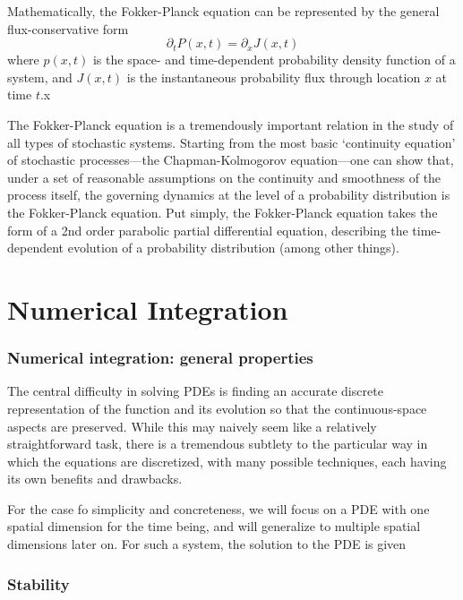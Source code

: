 \documentclass[15pt]{article}
\begin{document}
Mathematically, the Fokker-Planck equation can be represented by the general flux-conservative form
\begin{equation}
    \partial_t P(x, t) = \partial_x J(x, t)
\end{equation}
where $p(x, t)$ is the space- and time-dependent probability density function of a system, and $J(x, t)$ is the instantaneous probability flux through location $x$ at time $t$.x


The Fokker-Planck equation is a tremendously important relation in the study of all types of stochastic systems. Starting from the most basic `continuity equation' of stochastic processes---the Chapman-Kolmogorov equation---one can show that, under a set of reasonable assumptions on the continuity and smoothness of the process itself, the governing dynamics at the level of a probability distribution is the Fokker-Planck equation.  Put simply, the Fokker-Planck equation takes the form of a 2nd order parabolic partial differential equation, describing the time-dependent evolution of a probability distribution (among other things).

\part{Numerical Integration}


\section{Numerical integration: general properties}
The central difficulty in solving PDEs is finding an accurate discrete representation of the function and its evolution so that the continuous-space aspects are preserved.  While this may naively seem like a relatively straightforward task, there is a tremendous subtlety to the particular way in which the equations are discretized, with many possible techniques, each having its own benefits and drawbacks.

For the case fo simplicity and concreteness, we will focus on a PDE with one spatial dimension for the time being, and will generalize to multiple spatial dimensions later on. For such a system, the solution to the PDE is given

    \section{Stability}
\end{document}
